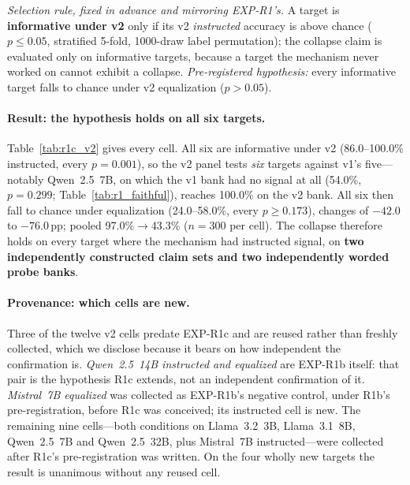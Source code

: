 \emph{Selection rule, fixed in advance and mirroring EXP-R1's.} A target is \textbf{informative under v2} only if its v2 \emph{instructed} accuracy is above chance ($p\!\leq\!0.05$, stratified 5-fold, 1000-draw label permutation); the collapse claim is evaluated only on informative targets, because a target the mechanism never worked on cannot exhibit a collapse. \emph{Pre-registered hypothesis:} every informative target falls to chance under v2 equalization ($p\!>\!0.05$).

\paragraph{Result: the hypothesis holds on all six targets.} Table~\ref{tab:r1c_v2} gives every cell. All six are informative under v2 (86.0--100.0\% instructed, every $p\!=\!0.001$), so the v2 panel tests \emph{six} targets against v1's five---notably Qwen~2.5~7B, on which the v1 bank had no signal at all (54.0\%, $p\!=\!0.299$; Table~\ref{tab:r1_faithful}), reaches 100.0\% on the v2 bank. All six then fall to chance under equalization (24.0--58.0\%, every $p\!\geq\!0.173$), changes of $-42.0$ to $-76.0$\,pp; pooled 97.0\%$\to$43.3\% ($n=300$ per cell). The collapse therefore holds on every target where the mechanism had instructed signal, on \textbf{two independently constructed claim sets and two independently worded probe banks}.

\paragraph{Provenance: which cells are new.} Three of the twelve v2 cells predate EXP-R1c and are reused rather than freshly collected, which we disclose because it bears on how independent the confirmation is. \emph{Qwen~2.5~14B instructed and equalized} are EXP-R1b itself: that pair is the hypothesis R1c extends, not an independent confirmation of it. \emph{Mistral~7B equalized} was collected as EXP-R1b's negative control, under R1b's pre-registration, before R1c was conceived; its instructed cell is new. The remaining nine cells---both conditions on Llama~3.2~3B, Llama~3.1~8B, Qwen~2.5~7B and Qwen~2.5~32B, plus Mistral~7B instructed---were collected after R1c's pre-registration was written. On the four wholly new targets the result is unanimous without any reused cell.

